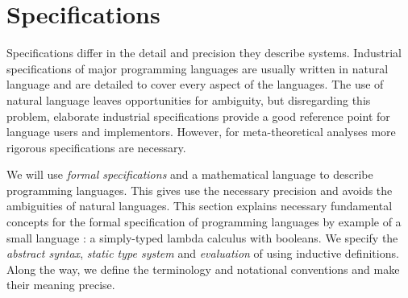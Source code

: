 {\section{Specifications}\label{sec:intro:specification}


Specifications differ in the detail and precision they describe systems.
Industrial specifications of major programming languages are usually written in
natural language and are detailed to cover every aspect of the languages. The
use of natural language leaves opportunities for ambiguity, but disregarding
this problem, elaborate industrial specifications provide a good reference point
for language users and implementors. However, for meta-theoretical analyses more
rigorous specifications are necessary.

We will use \emph{formal specifications} and a mathematical language to
describe programming languages. This gives use the necessary precision and
avoids the ambiguities of natural languages. This section explains necessary
fundamental concepts for the formal specification of programming languages by
example of a small language \stlcbool: a simply-typed lambda calculus with
booleans. We specify the \emph{abstract syntax}, \emph{static type system} and
\emph{evaluation} of \stlcbool using inductive definitions. Along the way, we
define the terminology and notational conventions and make their meaning
precise.

}

